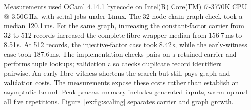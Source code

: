 Measurements used OCaml 4.14.1 bytecode on Intel(R) Core(TM) i7-3770K CPU @ 3.50GHz, with serial jobs under Linux. The 32-node chain graph check took a median 120.1\,ms. For the same graph, increasing the constant-factor carrier from 32 to 512 records increased the complete fibre-wrapper median from 156.7\,ms to 8.51\,s. At 512 records, the injective-factor case took 8.42\,s, while the early-witness case took 187.6\,ms. The implementation checks pairs on a retained carrier and performs tuple lookups; validation also checks duplicate record identifiers pairwise. An early fibre witness shortens the search but still pays graph and validation costs. The measurements expose these costs rather than establish an asymptotic bound. Peak process memory includes generated inputs, warm-up and all five repetitions. Figure~\ref{ex:fig:scaling} separates carrier and graph growth.

